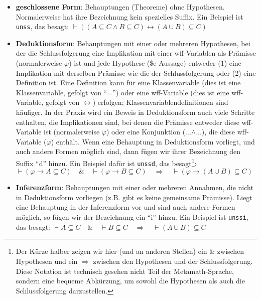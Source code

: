 \begin{itemize}
\item \textbf{geschlossene Form}:
Behauptungen (Theoreme) ohne Hypothesen. Normalerweise hat ihre Bezeichnung kein spezielles Suffix. Ein Beispiel ist \texttt{unss}, das besagt:
$\vdash ( ( A \subseteq C \wedge B \subseteq C ) \leftrightarrow ( A \cup B )
\subseteq C )\label{eq:unss}$
\item \textbf{Deduktionsform}:
Behauptungen mit einer oder mehreren Hypothesen, bei der die Schlussfolgerung eine Implikation mit einer wff-Variablen als Prämisse (normalerweise $\varphi$) ist und jede Hypothese (\$e Aussage) entweder (1) eine Implikation mit derselben Prämisse wie die der Schlussfolgerung oder (2) eine Definition ist. Eine Definition kann für eine Klassenvariable (dies ist eine Klassenvariable, gefolgt von "`="') oder eine wff-Variable (dies ist eine wff-Variable, gefolgt von $\leftrightarrow$) erfolgen; Klassenvariablendefinitionen sind häufiger. In der Praxis wird ein Beweis in Deduktionsform auch viele Schritte enthalten, die Implikationen sind, bei denen die Prämisse entweder diese wff-Variable ist (normalerweise $\varphi$) oder eine Konjunktion (...$\land$...), die diese wff-Variable ($\varphi$) enthält. Wenn eine Behauptung in Deduktionsform vorliegt, und auch andere Formen möglich sind, dann fügen wir ihrer Bezeichnung den Suffix "`d"' hinzu. Ein Beispiel dafür ist \texttt{unssd}, das besagt\footnote{Der Kürze halber zeigen wir hier (und an anderen Stellen) ein $\&$\index{$\&$} zwischen Hypothesen und ein $\Rightarrow$\index{$\Rightarrow$} zwischen den Hypothesen und der Schlussfolgerung. Diese Notation ist technisch gesehen nicht Teil der Metamath-Sprache, sondern eine bequeme Abkürzung, um sowohl die Hypothesen als auch die Schlussfolgerung darzustellen.}:
$\vdash ( \varphi \rightarrow A \subseteq C )\quad\&\quad \vdash ( \varphi
    \rightarrow B \subseteq C )\quad\Rightarrow\quad \vdash ( \varphi
    \rightarrow ( A \cup B ) \subseteq C )\label{eq:unssd}$
\item \textbf{Inferenzform}:
Behauptungen mit einer oder mehreren Annahmen, die nicht in Deduktionsform vorliegen (z.B. gibt es keine gemeinsame Prämisse). Liegt eine Behauptung in der Inferenzform vor und sind auch andere Formen möglich, so fügen wir der Bezeichnung ein "`i"' hinzu. Ein Beispiel ist \texttt{unssi}, das besagt:
$\vdash A \subseteq C\quad\&\quad \vdash B \subseteq C\quad\Rightarrow\quad
    \vdash ( A \cup B ) \subseteq C\label{eq:unssi}$
\end{itemize}

